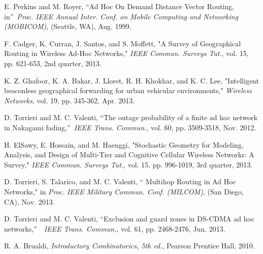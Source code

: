 \documentclass[conference]{IEEEtran}
\begin{document}
\begin{thebibliography}{9}
E. Perkins and M. Royer, \textquotedblleft Ad Hoc On Demand
Distance Vector Routing, in\textquotedblright\ \textit{Proc. IEEE Annual Inter. Conf. on Mobile Computing and Networking (MOBICOM)}, (Seattle, WA), Aug. 1999.

F. Cadger, K. Curran, J. Santos, and S. Moffett, "A Survey of
Geographical Routing in Wireless Ad-Hoc Networks," \textit{IEEE Commun.
Surveys Tut.}, vol. 15, pp. 621-653, 2nd quarter, 2013.

K. Z. Ghafoor, K. A. Bakar, J. Lloret, R. H. Khokhar, and K. C. Lee, "Intelligent beaconless geographical
forwarding for urban vehicular environments," \textit{Wireless Networks}, vol.
19, pp. 345-362, Apr. 2013.

D. Torrieri and M. C. Valenti, \textquotedblleft The outage
probability of a finite ad hoc network in Nakagami fading,\textquotedblright \ \textit{IEEE Trans. Commun.}, vol. 60, pp. 3509-3518, Nov. 2012.

H. ElSawy, E. Hossain, and M. Haenggi, "Stochastic Geometry for
Modeling, Analysis, and Design of Multi-Tier and Cognitive Cellular Wireless
Networks: A Survey," \textit{IEEE Commun. Surveys Tut.}, vol. 15, pp.
996-1019, 3rd quarter, 2013.

D. Torrieri, S. Talarico, and M. C. Valenti, \textquotedblleft
Multihop Routing in Ad Hoc Networks," in \textit{Proc. IEEE Military Commun.
Conf. (MILCOM)}, (San Diego, CA), Nov. 2013.

D. Torrieri and M. C. Valenti, \textquotedblleft Exclusion and
guard zones in DS-CDMA ad hoc networks,\textquotedblright\ \ \textit{IEEE
Trans. Commun.}, vol. 61, pp. 2468-2476, Jun. 2013.

R. A. Brualdi, \textit{Introductory Combinatorics, 5th ed.},
Pearson Prentice Hall, 2010.
\end{thebibliography}
\end{document}
